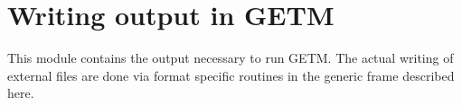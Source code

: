 
\section{Writing output in GETM}

This module contains the output necessary to run GETM. The actual
writing of external files are done via format specific routines in the
generic frame described here.

